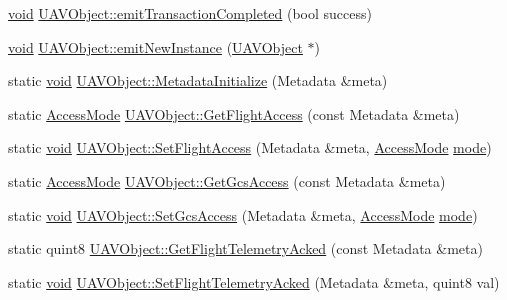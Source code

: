 \begin{DoxyCompactItemize}
\item 
\hyperlink{group___u_a_v_objects_plugin_ga444cf2ff3f0ecbe028adce838d373f5c}{void} \hyperlink{group___u_a_v_objects_plugin_ga30c0ae6383f58843feca4919232f0478}{U\-A\-V\-Object\-::emit\-Transaction\-Completed} (bool success)
\item 
\hyperlink{group___u_a_v_objects_plugin_ga444cf2ff3f0ecbe028adce838d373f5c}{void} \hyperlink{group___u_a_v_objects_plugin_ga6085b5c08522017f9a59a087f7ccc073}{U\-A\-V\-Object\-::emit\-New\-Instance} (\hyperlink{class_u_a_v_object}{U\-A\-V\-Object} $\ast$)
\item 
static \hyperlink{group___u_a_v_objects_plugin_ga444cf2ff3f0ecbe028adce838d373f5c}{void} \hyperlink{group___u_a_v_objects_plugin_ga0e0e6753710634f75bf5f27e0c3e073a}{U\-A\-V\-Object\-::\-Metadata\-Initialize} (Metadata \&meta)
\item 
static \hyperlink{uavobjectparser_8h_ab22d35ed086a478dd91e93ac78037f40}{Access\-Mode} \hyperlink{group___u_a_v_objects_plugin_ga98889e5102c4c2d2c9f1a47c03633218}{U\-A\-V\-Object\-::\-Get\-Flight\-Access} (const Metadata \&meta)
\item 
static \hyperlink{group___u_a_v_objects_plugin_ga444cf2ff3f0ecbe028adce838d373f5c}{void} \hyperlink{group___u_a_v_objects_plugin_gaa660f23e03de07c425e5162e2dc42c4f}{U\-A\-V\-Object\-::\-Set\-Flight\-Access} (Metadata \&meta, \hyperlink{uavobjectparser_8h_ab22d35ed086a478dd91e93ac78037f40}{Access\-Mode} \hyperlink{glext_8h_a1e71d9c196e4683cc06c4b54d53f7ef5}{mode})
\item 
static \hyperlink{uavobjectparser_8h_ab22d35ed086a478dd91e93ac78037f40}{Access\-Mode} \hyperlink{group___u_a_v_objects_plugin_ga7efd83f9d2ce75464022ed2e05c33920}{U\-A\-V\-Object\-::\-Get\-Gcs\-Access} (const Metadata \&meta)
\item 
static \hyperlink{group___u_a_v_objects_plugin_ga444cf2ff3f0ecbe028adce838d373f5c}{void} \hyperlink{group___u_a_v_objects_plugin_ga55ae4b0f44dc39c52da3d4173345c19b}{U\-A\-V\-Object\-::\-Set\-Gcs\-Access} (Metadata \&meta, \hyperlink{uavobjectparser_8h_ab22d35ed086a478dd91e93ac78037f40}{Access\-Mode} \hyperlink{glext_8h_a1e71d9c196e4683cc06c4b54d53f7ef5}{mode})
\item 
static quint8 \hyperlink{group___u_a_v_objects_plugin_ga98522650b206f948c9141115c15d1d13}{U\-A\-V\-Object\-::\-Get\-Flight\-Telemetry\-Acked} (const Metadata \&meta)
\item 
static \hyperlink{group___u_a_v_objects_plugin_ga444cf2ff3f0ecbe028adce838d373f5c}{void} \hyperlink{group___u_a_v_objects_plugin_ga92f2e8fef7adb87575582d52a4d90519}{U\-A\-V\-Object\-::\-Set\-Flight\-Telemetry\-Acked} (Metadata \&meta, quint8 val)

\end{DoxyCompactItemize}
